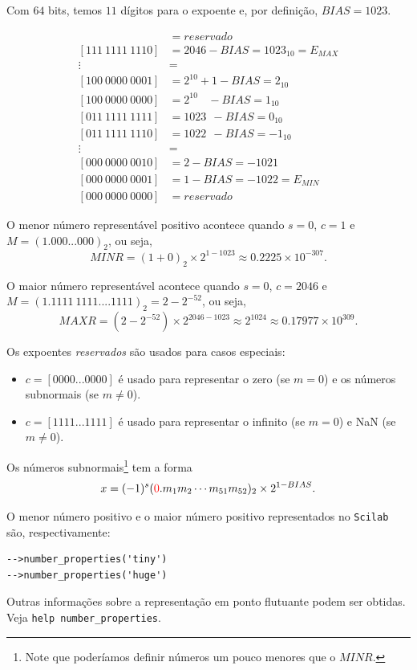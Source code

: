 \documentclass[main.tex]{subfiles}
\begin{document}
\begin{ex}
Com $64$ bits, temos $11$ dígitos para o expoente e, por definição, $BIAS=1023$.

\begin{align*}
 [111~1111~1111] &= reservado\\
 [111~1111~1110] &= 2046-BIAS      = 1023_{10}= E_{MAX}\\
     \vdots      &=  \\
 [100~0000~0001] &= 2^{10}+1  -BIAS =  2_{10} \\
 [100~0000~0000] &= 2^{10}~~~~-BIAS =  1_{10} \\
 [011~1111~1111] &= 1023   ~~ -BIAS =  0_{10} \\
 [011~1111~1110] &= 1022   ~~ -BIAS = -1_{10} \\
     \vdots      &=  \\
 [000~0000~0010] &= 2-BIAS = -1021 \\
 [000~0000~0001] &= 1-BIAS = -1022 = E_{MIN}\\
 [000~0000~0000] &= reservado
\end{align*}
\end{ex}


O menor número representável positivo acontece quando $s=0$, $c=1$ e $M=(1.000...000)_2$, ou seja,
$$
MINR=(1+0)_2\times 2^{1-1023} \approx 0.2225\times 10^{-307}.
$$

O maior número representável acontece quando $s=0$, $c=2046$ e $M=(1.1111~1111....1111)_2=2-2^{-52}$, ou seja,
$$
MAXR=(2-2^{-52})\times 2^{2046-1023} \approx 2^{1024}\approx0.17977\times 10^{309}.
$$

Os expoentes \emph{reservados} são usados para casos especiais:
\begin{itemize}
 \item $c=[0000...0000]$ é usado para representar o zero (se $m=0$) e os números subnormais (se $m\neq 0$).
 \item $c=[1111...1111]$ é usado para representar o infinito (se $m=0$) e NaN (se $m\neq 0$).
\end{itemize}
Os números subnormais\footnote{Note que poderíamos definir números um pouco menores que o $MINR$.} tem a forma
$$ x=(-1)^{s}({\color{red}{0}}.m_{1}m_{2}\cdots m_{51}m_{52})_2 \times 2^{1-BIAS}.$$

\ifisscilab
\begin{obs}
  O menor número positivo e o maior número positivo representados no \verb+Scilab+ são, respectivamente:
\begin{verbatim}
-->number_properties('tiny')
-->number_properties('huge')
\end{verbatim}
Outras informações sobre a representação em ponto flutuante podem ser obtidas. Veja \verb+help number_properties+.
\end{obs}
\fi
\end{document}
